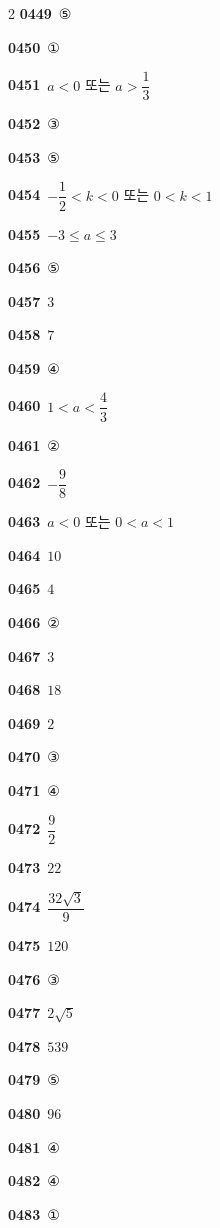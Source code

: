 \documentclass[10pt,a4paper]{article}
\begin{document}
\begin{multicols}{2}
\noindent\textbf{0449}\ ⑤\par
\noindent\textbf{0450}\ ①\par
\noindent\textbf{0451}\ $a<0$ 또는 $a>\dfrac{1}{3}$\par
\noindent\textbf{0452}\ ③\par
\noindent\textbf{0453}\ ⑤\par
\noindent\textbf{0454}\ $-\dfrac{1}{2}<k<0$ 또는 $0<k<1$\par
\noindent\textbf{0455}\ $-3\le a\le 3$\par
\noindent\textbf{0456}\ ⑤\par
\noindent\textbf{0457}\ $3$\par
\noindent\textbf{0458}\ $7$\par
\noindent\textbf{0459}\ ④\par
\noindent\textbf{0460}\ $1<a<\dfrac{4}{3}$\par
\noindent\textbf{0461}\ ②\par
\noindent\textbf{0462}\ $-\dfrac{9}{8}$\par
\noindent\textbf{0463}\ $a<0$ 또는 $0<a<1$\par
\noindent\textbf{0464}\ $10$\par
\noindent\textbf{0465}\ $4$\par
\noindent\textbf{0466}\ ②\par
\noindent\textbf{0467}\ $3$\par
\noindent\textbf{0468}\ $18$\par
\noindent\textbf{0469}\ $2$\par
\noindent\textbf{0470}\ ③\par
\noindent\textbf{0471}\ ④\par
\noindent\textbf{0472}\ $\dfrac{9}{2}$\par
\noindent\textbf{0473}\ $22$\par
\noindent\textbf{0474}\ $\dfrac{32\sqrt{3}}{9}$\par
\noindent\textbf{0475}\ $120$\par
\noindent\textbf{0476}\ ③\par
\noindent\textbf{0477}\ $2\sqrt{5}$\par
\noindent\textbf{0478}\ $539$\par
\noindent\textbf{0479}\ ⑤\par
\noindent\textbf{0480}\ $96$\par
\noindent\textbf{0481}\ ④\par
\noindent\textbf{0482}\ ④\par
\noindent\textbf{0483}\ ①\par

\end{multicols}
\end{document}
